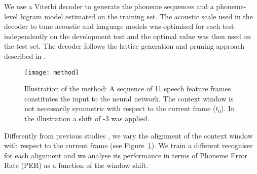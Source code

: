 We use a Viterbi decoder to generate the phoneme sequences and a phoneme-level bigram model estimated on the training set.
The acoustic scale used in the decoder to tune acoustic and language models was optimised for each test independently on the development test and the optimal value was then used on the test set.
The decoder follows the lattice generation and pruning approach described in \cite{danp12}.

\begin{figure}
\texttt{[image: method]}
\caption{Illustration of the method: A sequence of 11 speech feature frames constitutes the input to the neural network. The context window is not necessarily symmetric with respect to the current frame ($t_0$). In the illustration a shift of -3 was applied.}
\label{fig:dnnlatnn}
\end{figure}

Differently from previous studies \cite{Mohamed12, pdnn, dbn09, YaoEtAl2012SLTadaptation, DahlEtAl2011ICASSP}, we vary the alignment of the context window with respect to the current frame (see Figure~\ref{fig:dnnlatnn}). We train a different recogniser for each alignment and we analyse its performance in terms of Phoneme Error Rate (PER) as a function of the window shift.

\endinput

